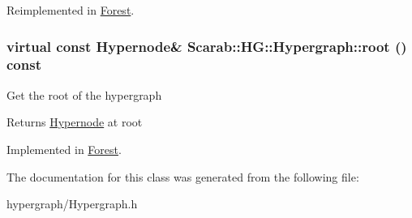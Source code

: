 Reimplemented in \hyperlink{classForest_a621a1a65d0f877bb33b15c79f9e24c4d}{Forest}.

\hypertarget{classScarab_1_1HG_1_1Hypergraph_ad8db2ab9208202af5c9ce9739c670c56}{
\subsubsection[{root}]{\setlength{\rightskip}{0pt plus 5cm}virtual const {\bf Hypernode}\& Scarab::HG::Hypergraph::root () const}}
\label{classScarab_1_1HG_1_1Hypergraph_ad8db2ab9208202af5c9ce9739c670c56}
Get the root of the hypergraph

\begin{DoxyReturn}{Returns}
\hyperlink{classScarab_1_1HG_1_1Hypernode}{Hypernode} at root 
\end{DoxyReturn}


Implemented in \hyperlink{classForest_a452873acdd9bf37df4c7d4df57a1e3f8}{Forest}.



The documentation for this class was generated from the following file:\begin{DoxyCompactItemize}
\item 
hypergraph/Hypergraph.h\end{DoxyCompactItemize}
